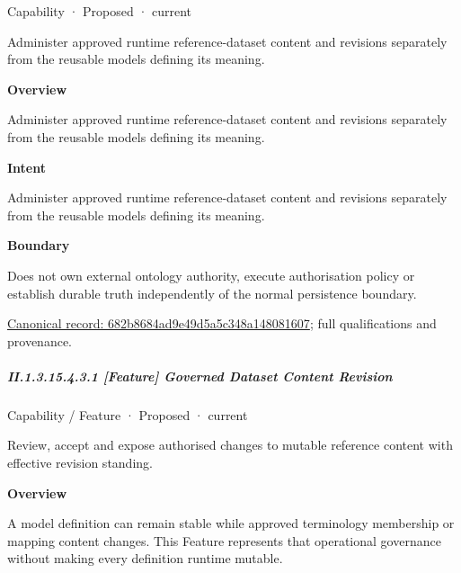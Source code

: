 \label{element:682b8684ad9e49d5a5c348a148081607}
{\small Capability · Proposed · current}\par

Administer approved runtime reference-dataset content and revisions separately from the reusable models defining its meaning.



\textbf{Overview}



Administer approved runtime reference-dataset content and revisions separately from the reusable models defining its meaning.



\textbf{Intent}



Administer approved runtime reference-dataset content and revisions separately from the reusable models defining its meaning.



\textbf{Boundary}



Does not own external ontology authority, execute authorisation policy or establish durable truth independently of the normal persistence boundary.


{\footnotesize \href{../../../../continuum/strategy/capability/682b8684ad9e49d5a5c348a148081607.md}{Canonical record: 682b8684ad9e49d5a5c348a148081607}; full qualifications and provenance.}\par
\subparagraph*{II.1.3.15.4.3.1 [Feature] Governed Dataset Content Revision}
\label{navigation:II.1.3.15.4.3.1}

\label{element:89123c868b8a46c38800916110cd918d}
{\small Capability / Feature · Proposed · current}\par

Review, accept and expose authorised changes to mutable reference content with effective revision standing.



\textbf{Overview}



A model definition can remain stable while approved terminology membership or mapping content changes. This Feature represents that operational governance without making every definition runtime mutable.



